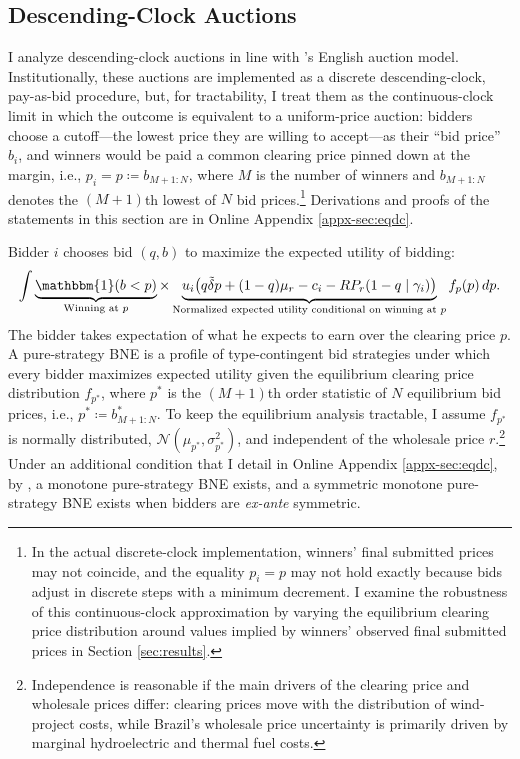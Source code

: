 \documentclass[12pt]{article}
\theoremstyle{definition} %
\newcommand{\I}{\mathbbm{1}}
\begin{document}
\subsection{Descending-Clock Auctions}
\label{sec:dc}

I analyze descending-clock auctions in line with \citet{Milgrom1982}'s English auction model. Institutionally, these auctions are implemented as a discrete descending-clock, pay-as-bid procedure, but, for tractability, I treat them as the continuous-clock limit in which the outcome is equivalent to a uniform-price auction: bidders choose a cutoff---the lowest price they are willing to accept---as their ``bid price'' $b_i$, and winners would be paid a common clearing price pinned down at the margin, i.e., $p_i=p\coloneqq b_{M+1:N}$, where $M$ is the number of winners and $b_{M+1:N}$ denotes the $(M+1)$th lowest of $N$ bid prices.\footnote{
In the actual discrete-clock implementation, winners' final submitted prices may not coincide, and the equality $p_i=p$ may not hold exactly because bids adjust in discrete steps with a minimum decrement. I examine the robustness of this continuous-clock approximation by varying the equilibrium clearing price distribution around values implied by winners' observed final submitted prices in Section \ref{sec:results}.
}
Derivations and proofs of the statements in this section are in Online Appendix \ref{appx-sec:eqdc}.

Bidder $i$ chooses bid $(q,b)$ to maximize the expected utility of bidding:
\begin{align*}
\int \underbrace{\I(b < p)}_{\text{Winning at $p$}} \times 
\underbrace{u_i\!\left(q \tilde{\delta} p + (1 - q) \mu_r - c_i - RP_r(1-q \mid \gamma_i) \right)}_{\text{Normalized expected utility conditional on winning at $p$}} f_p(p)\, dp.
\end{align*}
The bidder takes expectation of what he expects to earn over the clearing price $p$. A pure-strategy BNE is a profile of type-contingent bid strategies under which every bidder maximizes expected utility given the equilibrium clearing price distribution $f_{p^\ast}$, where $p^\ast$ is the $(M+1)$th order statistic of $N$ equilibrium bid prices, i.e., $p^\ast \coloneqq b_{M+1:N}^\ast$. To keep the equilibrium analysis tractable, I assume $f_{p^\ast}$ is normally distributed, $\mathcal{N}(\mu_{p^\ast},\sigma_{p^\ast}^2)$, and independent of the wholesale price $r$.\footnote{
Independence is reasonable if the main drivers of the clearing price and wholesale prices differ: clearing prices move with the distribution of wind-project costs, while Brazil's wholesale price uncertainty is primarily driven by marginal hydroelectric and thermal fuel costs.
} Under an additional condition that I detail in Online Appendix \ref{appx-sec:eqdc}, by \citet{Reny2011}, a monotone pure-strategy BNE exists, and a symmetric monotone pure-strategy BNE exists when bidders are \textit{ex-ante} symmetric.
\end{document}
